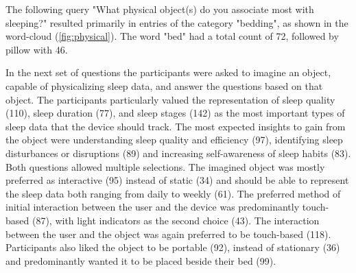 \documentclass[
  a4paper,  %
  twoside,  %
  bibliography=totoc,
  headsepline,
  cleardoublepage=empty,
  parskip=half,
  draft=false
]{scrbook}
\begin{document}
The following query "What physical object(s) do you associate most with sleeping?" resulted primarily in entries of the category "bedding", as shown in the word-cloud (\autoref{fig:physical}). The word "bed" had a total count of 72, followed by pillow with 46.

In the next set of questions the participants were asked to imagine an object, capable of physicalizing sleep data, and answer the questions based on that object. The participants particularly valued the representation of sleep quality (110), sleep duration (77), and sleep stages (142) as the most important types of sleep data that the device should track. The most expected insights to gain from the object were understanding sleep quality and efficiency (97), identifying sleep disturbances or disruptions (89) and increasing self-awareness of sleep habits (83). Both questions allowed multiple selections. The imagined object was mostly preferred as interactive (95) instead of static (34) and should be able to represent the sleep data both ranging from daily to weekly (61). The preferred method of initial interaction between the user and the device was predominantly touch-based (87), with light indicators as the second choice (43). The interaction between the user and the object was again preferred to be touch-based (118). Participants also liked the object to be portable (92), instead of stationary (36) and predominantly wanted it to be placed beside their bed (99).
\end{document}
